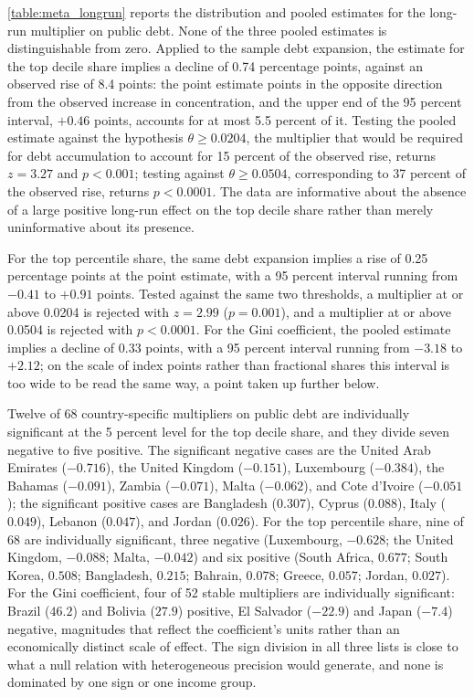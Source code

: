 \documentclass[12pt, titlepage]{article}
\numberwithin{equation}{section}
\begin{document}
\autoref{table:meta_longrun} reports the distribution and pooled estimates for the long-run multiplier on public debt. None of the three pooled estimates is distinguishable from zero. Applied to
the sample debt expansion, the estimate for the top decile share implies a
decline of 0.74 percentage points, against an observed rise of 8.4 points: the
point estimate points in the opposite direction from the observed increase in
concentration, and the upper end of the 95 percent interval, $+0.46$ points,
accounts for at most 5.5 percent of it. Testing the pooled estimate against the
hypothesis $\theta \geq 0.0204$, the multiplier that would be required for debt
accumulation to account for 15 percent of the observed rise, returns $z=3.27$
and $p<0.001$; testing against $\theta \geq 0.0504$, corresponding to 37
percent of the observed rise, returns $p<0.0001$. The data are informative
about the absence of a large positive long-run effect on the top decile share
rather than merely uninformative about its presence.

For the top percentile share, the same debt expansion implies a rise of 0.25
percentage points at the point estimate, with a 95 percent interval running
from $-0.41$ to $+0.91$ points. Tested against the same two thresholds, a
multiplier at or above 0.0204 is rejected with $z=2.99$ ($p=0.001$), and a
multiplier at or above 0.0504 is rejected with $p<0.0001$. For the Gini
coefficient, the pooled estimate implies a decline of 0.33 points, with a 95
percent interval running from $-3.18$ to $+2.12$; on the scale of index points
rather than fractional shares this interval is too wide to be read the same
way, a point taken up further below.

Twelve of 68 country-specific multipliers on public debt are individually
significant at the 5 percent level for the top decile share, and they divide
seven negative to five positive. The significant negative cases are the United
Arab Emirates ($-0.716$), the United Kingdom ($-0.151$), Luxembourg
($-0.384$), the Bahamas ($-0.091$), Zambia ($-0.071$), Malta ($-0.062$), and
Cote d'Ivoire ($-0.051$); the significant positive cases are Bangladesh
($0.307$), Cyprus ($0.088$), Italy ($0.049$), Lebanon ($0.047$), and Jordan
($0.026$). For the top percentile share, nine of 68 are individually
significant, three negative (Luxembourg, $-0.628$; the United Kingdom,
$-0.088$; Malta, $-0.042$) and six positive (South Africa, $0.677$; South
Korea, $0.508$; Bangladesh, $0.215$; Bahrain, $0.078$; Greece, $0.057$; Jordan,
$0.027$). For the Gini coefficient, four of 52 stable multipliers are
individually significant: Brazil ($46.2$) and Bolivia ($27.9$) positive, El
Salvador ($-22.9$) and Japan ($-7.4$) negative, magnitudes that reflect the
coefficient's units rather than an economically distinct scale of effect. The
sign division in all three lists is close to what a null relation with
heterogeneous precision would generate, and none is dominated by one sign or
one income group.
\end{document}
